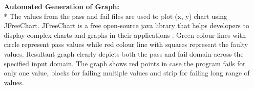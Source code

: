 \documentclass[runningheads,a4paper]{llncs}
\begin{document}
\noindent \textbf{Automated Generation of Graph:}\\*
\indent The values from the pass and fail files are used to plot (x, y) chart using JFreeChart. JFreeChart is a free open-source java library that helps developers to display complex charts and graphs in their applications \cite{Gilbert2008}. Green colour lines with circle represent pass values while red colour line with squares represent the faulty values. Resultant graph clearly depicts both the pass and fail domain across the specified input domain. The graph shows red points in case the program fails for only one value, blocks for failing multiple values and strip for failing long range of values.













\end{document}
